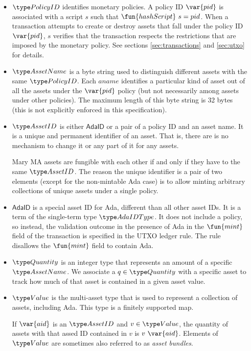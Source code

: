 \begin{itemize}
  \item $\PolicyID$ identifies monetary policies. A policy ID $\var{pid}$ is associated with a script
    $s$ such that $\fun{hashScript}~s=pid$. When a transaction attempts to create or destroy assets
    that fall under the policy ID $\var{pid}$,
    $s$ verifies that the transaction
    respects the restrictions that are imposed by the monetary policy.
    See sections \ref{sec:transactions} and \ref{sec:utxo} for details.

  \item $\AssetName$ is a byte string used to distinguish different assets with the same $\PolicyID$.
    Each $aname$ identifies a particular kind of asset out of all the assets under the
    $\var{pid}$ policy (but not necessarily among assets under other policies).
    The maximum length of this
    byte string is 32 bytes (this is not explicitly enforced in this specification).

  \item $\AssetID$ is either $\mathsf{AdaID}$ or a pair of a policy ID and an asset name.
  It is a unique and permanent
  identifier of an asset. That is, there are is no mechanism to change it or
  any part of it for any assets.

  Mary MA assets are fungible with each other if and only if they have to the same $\AssetID$.
  The reason the unique identifier is a pair of two elements (except for the non-mintable Ada case) is to allow
  minting arbitrary collections of unique assets under a single policy.

  \item $\mathsf{AdaID}$ is a special asset ID for Ada, different than all other asset IDs.
  It is a term of the single-term type $\AdaIDType$.
  It does not include a policy, so instead, the validation outcome in the presence
  of Ada in the $\fun{mint}$ field of the transaction is specified in the UTXO
  ledger rule. The rule disallows the $\fun{mint}$ field to contain Ada.

  \item $\Quantity$ is an integer type that represents an amount of a specific $\AssetName$. We associate
    a $q\in\Quantity$ with a specific asset to track how much of that asset is contained in a given asset value.

  \item $\Value$ is the multi-asset type that is used to represent
    a collection of assets, including Ada. This type is a finitely supported map.

    If $\var{aid}$ is an $\AssetID$ and $v \in \Value$,
    the quantity of assets with that assed ID contained in $v$ is $v~\var{aid}$.
    Elements of $\Value$ are sometimes also referred to as
    \emph{asset bundles}.
\end{itemize}

